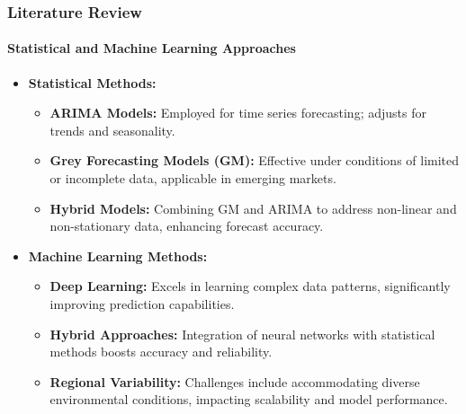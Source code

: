 \documentclass[light]{lutbeamer} %
\begin{document}
\begin{frame}
    \frametitle{Literature Review}
    \framesubtitle{Statistical and Machine Learning Approaches}
    \begin{itemize}
        \item \textbf{Statistical Methods:}
              \begin{itemize}
                  \item \textbf{ARIMA Models:} Employed for time series forecasting; adjusts for trends and seasonality.
                  \item \textbf{Grey Forecasting Models (GM):} Effective under conditions of limited or incomplete data, applicable in emerging markets.
                  \item \textbf{Hybrid Models:} Combining GM and ARIMA to address non-linear and non-stationary data, enhancing forecast accuracy.
              \end{itemize}
        \item \textbf{Machine Learning Methods:}
              \begin{itemize}
                  \item \textbf{Deep Learning:} Excels in learning complex data patterns, significantly improving prediction capabilities.
                  \item \textbf{Hybrid Approaches:} Integration of neural networks with statistical methods boosts accuracy and reliability.
                  \item \textbf{Regional Variability:} Challenges include accommodating diverse environmental conditions, impacting scalability and model performance.
              \end{itemize}
    \end{itemize}
\end{frame}
\end{document}

